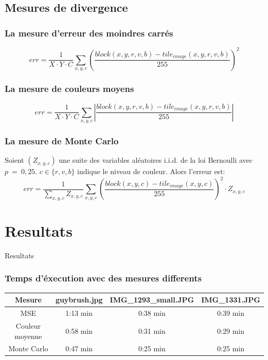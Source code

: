 \documentclass[handout]{beamer}
\begin{document}
\subsection{Mesures de divergence}

\begin{frame}
\frametitle{\bf La mesure d'erreur des moindres carr\'es}
\begin{equation*}
err=\frac{1}{X\cdot Y\cdot C}\sum_{x,y,c}\left(\frac{block(x,y,r,v,b)-tile_{image}(x,y,r,v,b)}{255}\right)^2
\end{equation*}
\end{frame}

\begin{frame}
\frametitle{\bf La mesure de couleurs moyens}
\begin{equation*}
err=\frac{1}{X\cdot Y\cdot C}\sum_{x,y,c}\left|\frac{block(x,y,r,v,b)-tile_{image}(x,y,r,v,b)}{255}\right|
\end{equation*}
\end{frame}
\begin{frame}
\frametitle{\bf La mesure de Monte Carlo}
Soient $(Z_{x,y,c})$ une suite des variables al\'eatoires i.i.d. de la loi Bernoulli avec $p~=~0,25$.
$c\in \{r,v,b\}$ indique le niveau de couleur.
Alors l'erreur est:
\begin{equation*}
err=\frac{1}{\sum_{x,y,c}Z_{x,y,c}}\sum_{x,y,c}\left(\frac{block(x,y,c)-tile_{image}(x,y,c)}{255}\right)^2\cdot Z_{x,y,c}
\end{equation*}
\end{frame}
\section{Resultats}

\begin{frame}
\begin{center}
{\Huge Resultats}
\end{center}
\end{frame}


\begin{frame}
\frametitle{\bf Temps d'\'execution avec des mesures differents}
\begin{table}
\begin{tabular}{|c|c|c|c|}
\hline 
\small Mesure & \small guybrush.jpg & \small IMG\_1293\_small.JPG & \small IMG\_1331.JPG \\ 
\hline 
\small MSE & 1:13 min & 0:38 min & 0:39 min \\ 
\hline 
\small Couleur moyenne & 0:58 min & 0:31 min & 0:29 min \\ 
\hline 
\small Monte Carlo & 0:47 min & 0:25 min & 0:25 min \\ 
\hline 

\end{tabular}
\label{tab:temps}  
\end{table}
\end{frame}
\end{document}
